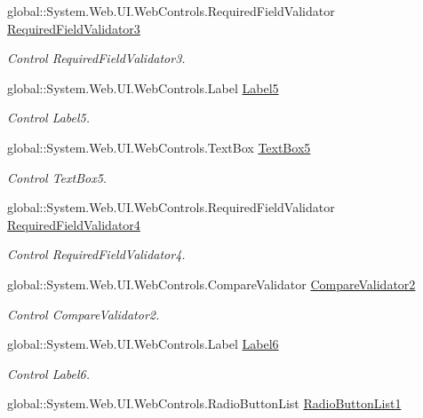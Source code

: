 \begin{DoxyCompactItemize}
global\+::\+System.\+Web.\+U\+I.\+Web\+Controls.\+Required\+Field\+Validator \mbox{\hyperlink{classInicio_1_1Registro_a24b35dd88cea1b27e18e681d9f1bd24a}{Required\+Field\+Validator3}}
\begin{DoxyCompactList}\small\item\em Control Required\+Field\+Validator3. \end{DoxyCompactList}\item 
global\+::\+System.\+Web.\+U\+I.\+Web\+Controls.\+Label \mbox{\hyperlink{classInicio_1_1Registro_abe5ff1ad9dfeb25a9e673175b1aa828f}{Label5}}
\begin{DoxyCompactList}\small\item\em Control Label5. \end{DoxyCompactList}\item 
global\+::\+System.\+Web.\+U\+I.\+Web\+Controls.\+Text\+Box \mbox{\hyperlink{classInicio_1_1Registro_a9bc70ac4aacbc0573d097586b9663f28}{Text\+Box5}}
\begin{DoxyCompactList}\small\item\em Control Text\+Box5. \end{DoxyCompactList}\item 
global\+::\+System.\+Web.\+U\+I.\+Web\+Controls.\+Required\+Field\+Validator \mbox{\hyperlink{classInicio_1_1Registro_a50ab8ab72bcd7c32903c8af8acb766ea}{Required\+Field\+Validator4}}
\begin{DoxyCompactList}\small\item\em Control Required\+Field\+Validator4. \end{DoxyCompactList}\item 
global\+::\+System.\+Web.\+U\+I.\+Web\+Controls.\+Compare\+Validator \mbox{\hyperlink{classInicio_1_1Registro_abb680432cdd29ebb5f813036c644dadc}{Compare\+Validator2}}
\begin{DoxyCompactList}\small\item\em Control Compare\+Validator2. \end{DoxyCompactList}\item 
global\+::\+System.\+Web.\+U\+I.\+Web\+Controls.\+Label \mbox{\hyperlink{classInicio_1_1Registro_a1f4d81dd35af2a53cf1df120b4f9b383}{Label6}}
\begin{DoxyCompactList}\small\item\em Control Label6. \end{DoxyCompactList}\item 
global\+::\+System.\+Web.\+U\+I.\+Web\+Controls.\+Radio\+Button\+List \mbox{\hyperlink{classInicio_1_1Registro_a6a93f0b66e0c307a8f53722f3f41ce91}{Radio\+Button\+List1}}

\end{DoxyCompactItemize}
